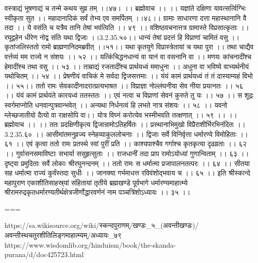 वस्त्राद्यं भूषणाद्यं च तन्मे कथय सुव्र तम् ।।४७। ।।
ब्रह्मोवाच ।। ।।
यज्ञांते दक्षिणा यावत्सर्त्विग्भिः स्वीकृता सुत ।।
महादानादिकं सर्वं तेभ्य एव समर्पितम् ।।४८।।
ग्रामाः साधारणा दत्ता महास्थानानि वै तदा ।।
ये वसंति च यत्रैव तानि तेषां भवंत्विति ।। ४९ ।।
वशिष्ठवचनात्तत्र ग्रामास्ते विप्रसात्कृताः ।।
रघूद्वहेन धीरेण नोद्व संति यथा द्विजाः ।।3.2.35.५०।।
धान्यं तेषां प्रदत्तं हि विप्राणां चामितं वसु ।।
कृतांजलिस्ततो रामो ब्राह्मणानिदमब्रवीत् ।।५१।।
यथा कृतयुगे विप्रास्त्रेतायां च यथा पुरा ।।
तथा चाद्यैव वर्त्तव्यं मम राज्ये न संशयः ।। ५२ ।।
यत्किंचिद्धनधान्यं वा यानं वा वसनानि वा ।।
मणयः कांचनादींश्च हेमादींश्च तथा वसु ।। ५३ ।।
ताम्राद्यं रजतादींश्च प्रार्थयध्वं ममाधुना ।।
अधुना वा भविष्ये वाभ्यर्थनीयं यथोचितम् ।। ५४ ।।
प्रेषणीयं वाचिकं मे सर्वदा द्विजसत्तमाः ।।
यंयं कामं प्रार्थयध्वं तं तं दास्याम्यहं विभो ।। ५५।।
ततो रामः सेवकादीनादरात्प्रत्यभाषत ।।
विप्राज्ञा नोल्लंघनीया सेव नीया प्रयत्नतः ।। ५६ ।।
यंयं कामं प्रार्थयंते कारयध्वं ततस्ततः ।।
एवं नत्वा च विप्राणां सेवनं कुरुते तु यः ।। ५७ ।।
स शूद्रः स्वर्गमाप्नोति धनवान्पुत्रवान्भवेत् ।।
अन्यथा निर्धनत्वं हि लभते नात्र संशयः ।। ५८ ।।
यवनो म्लेच्छजातीयो दैत्यो वा राक्षसोपि वा।।
योत्र विघ्नं करोत्येव भस्मीभवति तत्क्षणात् ।। ५९ ।।
।। ब्रह्मोवाच ।। ।।
ततः प्रदक्षिणीकृत्य द्विजान्रामोऽतिहर्षितः ।।
प्रस्थानाभिमुखो विप्रैराशीर्भिरभिनंदितः ।। 3.2.35.६० ।।
आसीमांतमनुव्रज्य स्नेहव्याकुललोचनाः ।।
द्विजाः सर्वे विनिर्वृत्ता धर्मारण्ये विमोहिताः ।। ६१ ।।
एवं कृत्वा ततो रामः प्रतस्थे स्वां पुरीं प्रति ।।
काश्यपाश्चैव गर्गाश्च कृतकृत्या दृढव्रताः ।। ६२ ।।
गुर्वासनसमाविष्टाः सभार्या ससुहृत्सुताः ।।
राजधानीं तदा प्राप रामोऽयोध्यां गुणान्विताम् ।। ६३ ।।
दृष्ट्वा प्रमुदिताः सर्वे लोकाः श्रीरघुनन्दनम् ।।
ततो रामः स धर्मात्मा प्रजापालनतत्परः ।। ६४ ।।
सीतया सह धर्मात्मा राज्यं कुर्वंस्तदा सुधीः ।।
जानक्या गर्भमाधत्त रविवंशोद्भवाय च ।। ६५ ।।
इति श्रीस्कान्दे महापुराण एकाशीतिसाहस्र्यां संहितायां तृतीये ब्रह्मखण्डे पूर्वभागे धर्मारण्यमाहात्म्ये श्रीरामरुद्रकृतधर्मारण्यतीर्थक्षेत्रजीर्णोद्धारवर्णनं नाम पञ्चत्रिंशोऽध्यायः ।। ३५ ।।

===

https://sa.wikisource.org/wiki/स्कन्दपुराणम्/खण्डः_५_(अवन्तीखण्डः)/अवन्तीस्थचतुरशीतिलिङ्गमाहात्म्यम्/अध्यायः_७९
https://www.wisdomlib.org/hinduism/book/the-skanda-purana/d/doc425723.html



